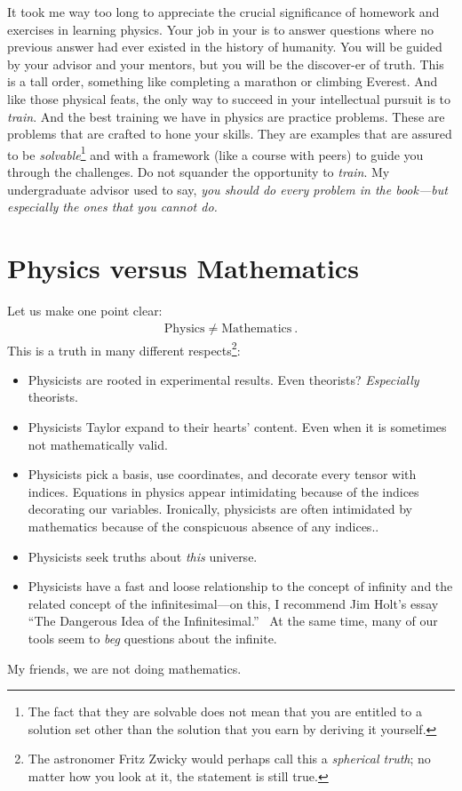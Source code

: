 \documentclass[
  11pt,
	colorful,
	raggedright,
]{tufte-style-thesis-flip}
\begin{document}
It took me way too long to appreciate the crucial significance of homework and exercises in learning physics. Your job in your  is to answer questions where no previous answer had ever existed in the history of humanity. You will be guided by your advisor and your mentors, but you will be the discover-er of truth. This is a tall order, something like completing a marathon or climbing Everest. And like those physical feats, the only way to succeed in your intellectual pursuit is to \emph{train}. And the best training we have in physics are practice problems. These are problems that are crafted to hone your skills. They are examples that are assured to be \emph{solvable}\footnote{The fact that they are solvable does not mean that you are entitled to a solution set other than the solution that you earn by deriving it yourself.} and with a framework (like a course with peers) to guide you through the challenges. Do not squander the opportunity to \emph{train}. My undergraduate advisor used to say, \emph{you should do every problem in the book---but especially the ones that you cannot do.}



\chapter{Physics versus Mathematics} 

Let us make one point clear:
\begin{align}
  \text{Physics} \neq \text{Mathematics} \ .
\end{align}
This is a truth in many different respects\footnote{The astronomer Fritz Zwicky would perhaps call this a \emph{spherical truth}; no matter how you look at it, the statement is still true.}:
\begin{itemize}
  \item Physicists are rooted in experimental results. {Even theorists? \emph{Especially} theorists.}
  
  \item Physicists Taylor expand to their hearts’ content. Even when it is sometimes not mathematically valid.~

  \item Physicists pick a basis, use coordinates, and decorate every tensor with indices. {Equations in physics appear intimidating because of the indices decorating our variables. Ironically, physicists are often intimidated by mathematics because of the conspicuous absence of any indices.}.

  \item Physicists seek truths about \emph{this} universe.

  \item Physicists have a fast and loose relationship to the concept of infinity and the related concept of the infinitesimal---on this, I recommend Jim Holt's essay ``The Dangerous Idea of the Infinitesimal.''~
  At the same time, many of our tools seem to \emph{beg} questions about the infinite.
\end{itemize}
My friends, we are not doing mathematics. 
\end{document}
